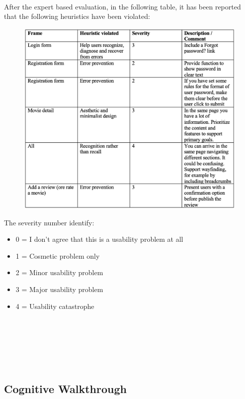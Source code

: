 \documentclass[12pt, a4paper]{article}
\numberwithin{figure}{section}
\begin{document}
\mbox{}\\
\noindent
After the expert based evaluation, in the following table, it has been reported that the following 
heuristics have been violated:
\begin{figure}[H]
	\centering
	\includegraphics[width=1\textwidth]{images/heuristicEvaluation.png}\\
\end{figure}
\noindent
The severity number identify:
\begin{itemize}
	\item 0 = I don’t agree that this is a usability problem at all
	\item 1 = Cosmetic problem only
	\item 2 = Minor usability problem
	\item 3 = Major usability problem
	\item 4 = Usability catastrophe
\end{itemize}
\mbox{}\\\\\\\\\\
\subsection{Cognitive Walkthrough}
\end{document}
